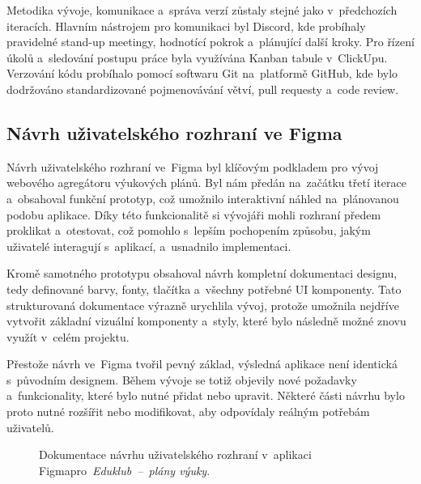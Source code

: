 \documentclass[male,czech,api_bc]{kitheses}
\begin{document}
Metodika vývoje, komunikace a~správa verzí zůstaly stejné jako v~předchozích iteracích. Hlavním nástrojem pro komunikaci byl Discord, kde probíhaly pravidelné stand-up meetingy, hodnotící pokrok a~plánující další kroky. Pro řízení úkolů a~sledování postupu práce byla využívána Kanban tabule v~ClickUpu. Verzování kódu probíhalo pomocí softwaru Git na~platformě GitHub, kde bylo dodržováno standardizované pojmenovávání větví, pull requesty a~code review.

\subsection{Návrh uživatelského rozhraní ve Figma}

Návrh uživatelského rozhraní ve~Figma byl klíčovým podkladem pro vývoj webového agregátoru výukových plánů. Byl nám předán na~začátku třetí iterace a~obsahoval funkční prototyp, což umožnilo interaktivní náhled na~plánovanou podobu aplikace. Díky této funkcionalitě si vývojáři mohli rozhraní předem proklikat a~otestovat, což pomohlo s~lepším pochopením způsobu, jakým uživatelé interagují s~aplikací, a~usnadnilo implementaci.

Kromě samotného prototypu obsahoval návrh kompletní dokumentaci designu, tedy definované barvy, fonty, tlačítka a~všechny potřebné UI komponenty. Tato strukturovaná dokumentace výrazně urychlila vývoj, protože umožnila nejdříve vytvořit základní vizuální komponenty a~styly, které bylo následně možné znovu využít v~celém projektu.

Přestože návrh ve~Figma tvořil pevný základ, výsledná aplikace není identická s~původním designem. Během vývoje se totiž objevily nové požadavky a~funkcionality, které bylo nutné přidat nebo upravit. Některé části návrhu bylo proto nutné rozšířit nebo modifikovat, aby odpovídaly reálným potřebám uživatelů.

\begin{figure}[H]
	\centering
	\caption{Dokumentace návrhu uživatelského rozhraní v~aplikaci Figma\break pro~\textit{Eduklub~--~plány výuky}.}
	\label{fig:eduklub-navrh-1}
\end{figure}
\end{document}
